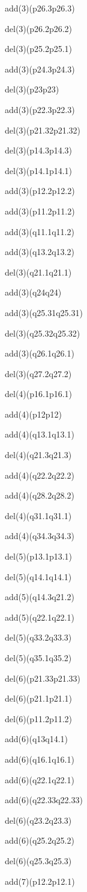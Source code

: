 \documentclass[]{article}
\begin{document}
add(3)(p26.3p26.3)

del(3)(p26.2p26.2)

del(3)(p25.2p25.1)

add(3)(p24.3p24.3)

del(3)(p23p23)

add(3)(p22.3p22.3)

del(3)(p21.32p21.32)

del(3)(p14.3p14.3)

del(3)(p14.1p14.1)

add(3)(p12.2p12.2)

add(3)(p11.2p11.2)

add(3)(q11.1q11.2)

add(3)(q13.2q13.2)

del(3)(q21.1q21.1)

add(3)(q24q24)

add(3)(q25.31q25.31)

del(3)(q25.32q25.32)

add(3)(q26.1q26.1)

del(3)(q27.2q27.2)

del(4)(p16.1p16.1)

add(4)(p12p12)

add(4)(q13.1q13.1)

del(4)(q21.3q21.3)

add(4)(q22.2q22.2)

add(4)(q28.2q28.2)

del(4)(q31.1q31.1)

add(4)(q34.3q34.3)

del(5)(p13.1p13.1)

del(5)(q14.1q14.1)

add(5)(q14.3q21.2)

add(5)(q22.1q22.1)

del(5)(q33.2q33.3)

del(5)(q35.1q35.2)

del(6)(p21.33p21.33)

del(6)(p21.1p21.1)

del(6)(p11.2p11.2)

add(6)(q13q14.1)

add(6)(q16.1q16.1)

add(6)(q22.1q22.1)

add(6)(q22.33q22.33)

del(6)(q23.2q23.3)

add(6)(q25.2q25.2)

del(6)(q25.3q25.3)

add(7)(p12.2p12.1)
\end{document}
